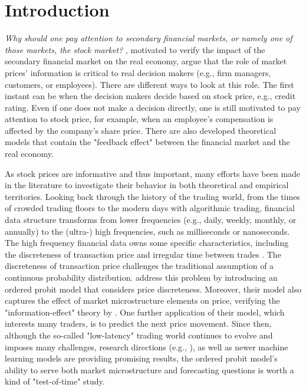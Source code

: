 \chapter{Introduction}\label{chap:introduction}


\textit{Why should one pay attention to secondary financial markets, or namely one of those markets, the stock market?} \citet{bondetal2012}, motivated to verify the impact of the secondary financial market on the real economy, argue that the role of market prices' information is critical to real decision makers (e.g., firm managers, customers, or employees). There are different ways to look at this role. The first instant can be when the decision makers decide based on stock price, e.g., credit rating. Even if one does not make a decision directly, one is still motivated to pay attention to stock price, for example, when an employee's compensation is affected by the company's share price. There are also developed theoretical models that contain the "feedback effect" between the financial market and the real economy.


As stock prices are informative and thus important, many efforts have been made in the literature to investigate their behavior in both theoretical and empirical territories. Looking back through the history of the trading world, from the times of crowded trading floors to the modern days with algorithmic trading, financial data structure transforms from lower frequencies (e.g., daily, weekly, monthly, or annually) to the (ultra-) high frequencies, such as milliseconds or nanoseconds. The high frequency financial data owns some specific characteristics, including the discreteness of transaction price and irregular time between trades \citep{tsay2013}. The discreteness of transaction price challenges the traditional assumption of a continuous probability distribution. \citet{hausman1992} address this problem by introducing an ordered probit model that considers price discreteness. Moreover, their model also captures the effect of market microstructure elements on price, verifying the "information-effect" theory by \citet{easleyohara1987}. One further application of their model, which interests many traders, is to predict the next price movement. Since then, although the so-called "low-latency" trading world continues to evolve and imposes many challenges, research directions (e.g., \citet{ohara2015}), as well as newer machine learning models are providing promising results, the ordered probit model's ability to serve both market microstructure and forecasting questions is worth a kind of "test-of-time" study.

